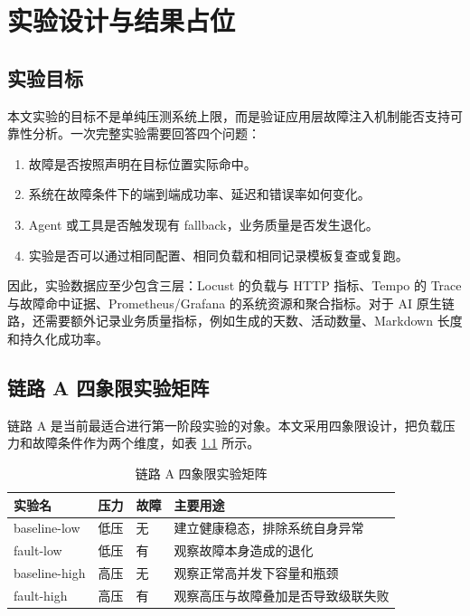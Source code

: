 \chapter{实验设计与结果占位}

\section{实验目标}

本文实验的目标不是单纯压测系统上限，而是验证应用层故障注入机制能否支持可靠性分析。一次完整实验需要回答四个问题：

\begin{enumerate}[label=(\arabic*)]
  \item 故障是否按照声明在目标位置实际命中。
  \item 系统在故障条件下的端到端成功率、延迟和错误率如何变化。
  \item Agent 或工具是否触发现有 fallback，业务质量是否发生退化。
  \item 实验是否可以通过相同配置、相同负载和相同记录模板复查或复跑。
\end{enumerate}

因此，实验数据应至少包含三层：Locust 的负载与 HTTP 指标、Tempo 的 Trace 与故障命中证据、Prometheus/Grafana 的系统资源和聚合指标。对于 AI 原生链路，还需要额外记录业务质量指标，例如生成的天数、活动数量、Markdown 长度和持久化成功率。

\section{链路 A 四象限实验矩阵}

链路 A 是当前最适合进行第一阶段实验的对象。本文采用四象限设计，把负载压力和故障条件作为两个维度，如表 \ref{tab:quadrants} 所示。

\begin{table}[htbp]
  \centering
  \caption{链路 A 四象限实验矩阵}
  \label{tab:quadrants}
  \begin{tabularx}{\textwidth}{p{2.8cm}p{2.2cm}p{2.2cm}X}
    \toprule
    实验名 & 压力 & 故障 & 主要用途 \\
    \midrule
    baseline-low & 低压 & 无 & 建立健康稳态，排除系统自身异常 \\
    fault-low & 低压 & 有 & 观察故障本身造成的退化 \\
    baseline-high & 高压 & 无 & 观察正常高并发下容量和瓶颈 \\
    fault-high & 高压 & 有 & 观察高压与故障叠加是否导致级联失败 \\
    \bottomrule
  \end{tabularx}
\end{table}

